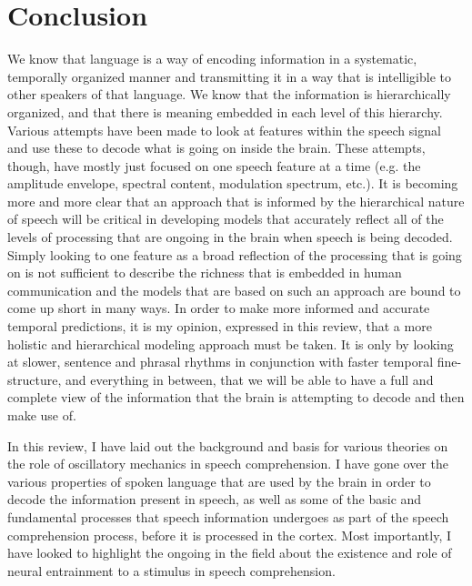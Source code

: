 \documentclass[titlepage]{article}
\begin{document}
\section{Conclusion}

    We know that language is a way of encoding information in a systematic, 
    temporally organized manner and transmitting it in a way that is intelligible 
    to other speakers of that language. We know that the information is 
    hierarchically organized, and that there is meaning embedded in each level 
    of this hierarchy. Various attempts have been made to look at 
    features within the speech signal and use these to decode what is going on 
    inside the brain. These attempts, though, have mostly just focused on one
    speech feature at a time (e.g. the amplitude envelope, spectral content, 
    modulation spectrum, etc.). It is becoming more and more clear that an 
    approach that is informed by the hierarchical nature of speech will be 
    critical in developing models that accurately reflect all of the levels 
    of processing that are ongoing in the brain when speech is being decoded. 
    Simply looking to one feature as a broad reflection of the processing that 
    is going on is not sufficient to describe the richness that is embedded 
    in human communication and the models that are based on such an approach 
    are bound to come up short in many ways. In order to make more informed and 
    accurate temporal predictions, it is my opinion, expressed in this review, 
    that a more holistic and hierarchical modeling approach must be taken. It 
    is only by looking at slower, sentence and phrasal rhythms in conjunction 
    with faster temporal fine-structure, and everything in between, that we  
    will be able to have a full and complete view of the information that the 
    brain is attempting to decode and then make use of. 

    In this review, I have laid out the background and basis for 
    various theories on the role of oscillatory mechanics in speech 
    comprehension. I have gone over the various properties of spoken language 
    that are used by the brain in order to decode the information present in 
    speech, as well as some of the basic and fundamental processes that 
    speech information undergoes as part of the speech comprehension process, 
    before it is processed in the cortex. 
    Most importantly, I have looked to highlight the ongoing in the field about 
    the existence and role of neural entrainment to a stimulus in speech 
    comprehension.
\end{document}

